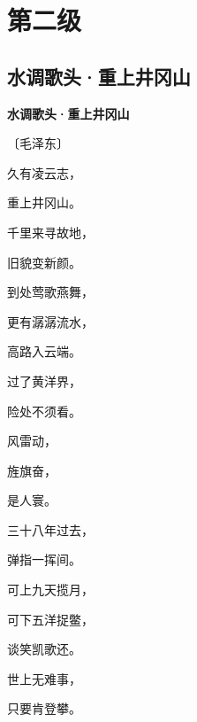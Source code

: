 \documentclass[12pt,UTF-8,openany,fontset=none]{ctexbook}
\begin{document}
\vspace{8pt}
\clearpage

\chapter{第二级}
\clearpage

\section{水调歌头·重上井冈山}


\begin{center}
    {\bfseries 水调歌头·重上井冈山}

    \vspace{18pt}

    \begin{large}\xuwen
        〔毛泽东〕
    \end{large}

\end{center}

    \vspace{18pt}  %

\begin{center}
    \begin{Large}

        久有凌云志，

        重上井冈山。

        千里来寻故地，

        旧貌变新颜。

        到处莺歌燕舞，

        更有潺潺流水，

        高路入云端。

        过了黄洋界，

        险处不须看。

        \vspace{18pt}  %

        风雷动，

        旌旗奋，

        是人寰。

        三十八年过去，

        弹指一挥间。

        可上九天揽月，

        可下五洋捉鳖，

        谈笑凯歌还。

        世上无难事，

        只要肯登攀。

    \end{Large}

\end{center}
\end{document}
